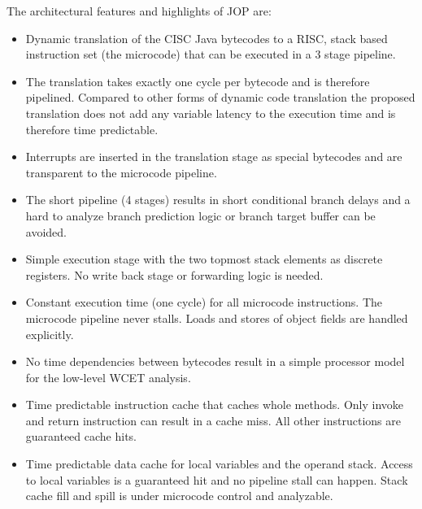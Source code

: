 The architectural features and highlights of JOP are:

\begin{itemize}

    \item Dynamic translation of the CISC Java bytecodes to a
        RISC, stack based instruction set (the microcode) that
        can be executed in a 3 stage pipeline.

    \item The translation takes exactly one cycle per bytecode
        and is therefore pipelined. Compared to other forms of
        dynamic code translation the proposed translation does
        not add any variable latency to the execution time and is
        therefore time predictable.

    \item Interrupts are inserted in the translation stage as
        special bytecodes and are transparent to the microcode
        pipeline.

    \item The short pipeline (4 stages) results in short
        conditional branch delays and a hard to analyze branch
        prediction logic or branch target buffer can be avoided.

    \item Simple execution stage with the two topmost stack
        elements as discrete registers. No write back stage or
        forwarding logic is needed.

    \item Constant execution time (one cycle) for all microcode
        instructions. The microcode pipeline never stalls. Loads
        and stores of object fields are handled explicitly.

    \item No time dependencies between bytecodes result in a
        simple processor model for the low-level WCET analysis.

    \item Time predictable instruction cache that caches whole
        methods. Only invoke and return instruction can result in
        a cache miss. All other instructions are guaranteed cache
        hits.

    \item Time predictable data cache for local variables and the
        operand stack. Access to local variables is a guaranteed
        hit and no pipeline stall can happen. Stack cache fill
        and spill is under microcode control and analyzable.


\end{itemize}
